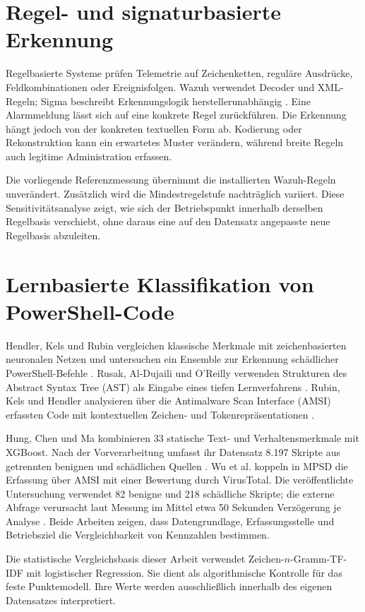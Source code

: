 \documentclass[12pt,a4paper,oneside,parskip=half]{scrreprt}
\begin{document}
\section{Regel- und signaturbasierte Erkennung}
Regelbasierte Systeme prüfen Telemetrie auf Zeichenketten, reguläre Ausdrücke, Feldkombinationen oder Ereignisfolgen. Wazuh verwendet Decoder und XML-Regeln; Sigma beschreibt Erkennungslogik herstellerunabhängig \cite{wazuh-rules,sigmahq-powershell}. Eine Alarmmeldung lässt sich auf eine konkrete Regel zurückführen. Die Erkennung hängt jedoch von der konkreten textuellen Form ab. Kodierung oder Rekonstruktion kann ein erwartetes Muster verändern, während breite Regeln auch legitime Administration erfassen.

Die vorliegende Referenzmessung übernimmt die installierten Wazuh-Regeln unverändert. Zusätzlich wird die Mindestregelstufe nachträglich variiert. Diese Sensitivitätsanalyse zeigt, wie sich der Betriebspunkt innerhalb derselben Regelbasis verschiebt, ohne daraus eine auf den Datensatz angepasste neue Regelbasis abzuleiten.

\section{Lernbasierte Klassifikation von PowerShell-Code}
Hendler, Kels und Rubin vergleichen klassische Merkmale mit zeichenbasierten neuronalen Netzen und untersuchen ein Ensemble zur Erkennung schädlicher PowerShell-Befehle \cite{hendler2018}. Rusak, Al-Dujaili und O'Reilly verwenden Strukturen des Abstract Syntax Tree (AST) als Eingabe eines tiefen Lernverfahrens \cite{rusak2018}. Rubin, Kels und Hendler analysieren über die Antimalware Scan Interface (AMSI) erfassten Code mit kontextuellen Zeichen- und Tokenrepräsentationen \cite{rubin2020}.

Hung, Chen und Ma kombinieren 33 statische Text- und Verhaltensmerkmale mit XGBoost. Nach der Vorverarbeitung umfasst ihr Datensatz 8.197 Skripte aus getrennten benignen und schädlichen Quellen \cite{hung2024}. Wu et al. koppeln in MPSD die Erfassung über AMSI mit einer Bewertung durch VirusTotal. Die veröffentlichte Untersuchung verwendet 82 benigne und 218 schädliche Skripte; die externe Abfrage verursacht laut Messung im Mittel etwa 50 Sekunden Verzögerung je Analyse \cite{wu2024mpsd}. Beide Arbeiten zeigen, dass Datengrundlage, Erfassungsstelle und Betriebsziel die Vergleichbarkeit von Kennzahlen bestimmen.

Die statistische Vergleichsbasis dieser Arbeit verwendet Zeichen-\(n\)-Gramm-TF-IDF mit logistischer Regression. Sie dient als algorithmische Kontrolle für das feste Punktemodell. Ihre Werte werden ausschließlich innerhalb des eigenen Datensatzes interpretiert.
\end{document}
